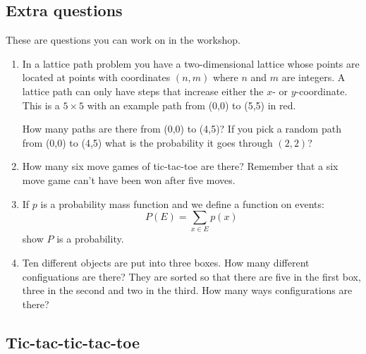 \documentclass[11pt,a4paper]{scrartcl}
\begin{document}
\subsection*{Extra questions}

These are questions you can work on in the workshop.

\begin{enumerate}

\item In a lattice path problem you have a two-dimensional lattice
  whose points are located at points with coordinates $(n,m)$ where
  $n$ and $m$ are integers. A lattice path can only have steps that
  increase either the $x$- or $y$-coordinate. This is a $5\times5$ with an example path from (0,0) to (5,5) in red.
\begin{center}
\end{center}
How many paths are there from (0,0) to (4,5)? If you pick a random path from (0,0) to (4,5) what is the probability it goes through $(2,2)$?

\item How many six move games of tic-tac-toe are there? Remember that
  a six move game can't have been won after five moves.

\item If $p$ is a probability mass function and we define a function on events:
  \begin{equation}
    P(E)=\sum_{x\in E}p(x)
  \end{equation}
  show $P$ is a probability.

\item Ten different objects are put into three boxes. How many different configuations are there? They are sorted so that there are five in the first box, three in the second and two in the third. How many ways configurations are there?
  
\end{enumerate}

\subsection*{Tic-tac-tic-tac-toe}
\end{document}
